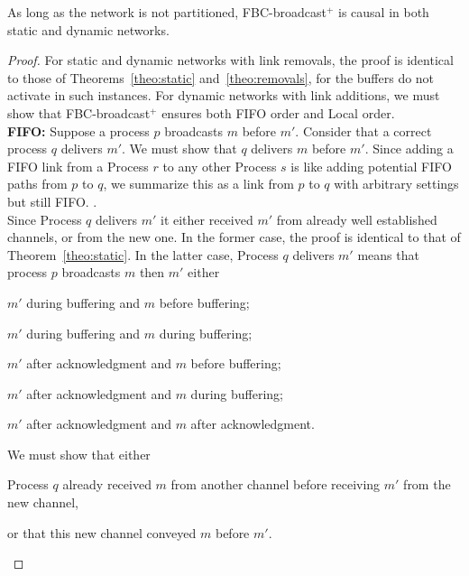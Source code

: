 \begin{theorem}
  As long as the network is not partitioned, FBC-broadcast$^+$ is causal in both
  static and dynamic networks.
\end{theorem}

\begin{proof}
  For static and dynamic networks with link removals, the proof is identical to
  those of Theorems~\ref{theo:static} and~\ref{theo:removals}, for the buffers
  do not activate in such instances. For dynamic networks with link additions,
  we must show that FBC-broadcast$^+$ ensures both
  FIFO order and Local order. \\
  \textbf{FIFO:} Suppose a process $p$ broadcasts $m$ before $m'$. Consider that
  a correct process $q$ delivers $m'$. We must show that $q$ delivers $m$ before
  $m'$.  Since adding a FIFO link from a Process $r$ to any other Process $s$ is
  like adding potential FIFO paths from $p$ to $q$, we summarize this as a link
  from $p$ to $q$ with arbitrary settings but still FIFO.  . \\   
  Since Process $q$ delivers $m'$ it either received $m'$ from already well
  established channels, or from the new one. In the former case, the proof is
  identical to that of Theorem~\ref{theo:static}. In the latter case, Process
  $q$ delivers $m'$ means that process $p$ broadcasts $m$ then $m'$ either
  \begin{inparaenum}[(i)]
  \item \label{case:one} $m'$ during buffering and $m$ before buffering;
  \item \label{case:two} $m'$ during buffering and $m$ during buffering;
  \item \label{case:three} $m'$ after acknowledgment and $m$ before buffering;
  \item \label{case:four} $m'$ after acknowledgment and $m$ during buffering;
  \item \label{case:five} $m'$ after acknowledgment and $m$ after acknowledgment.
  \end{inparaenum}
  We must show that either 
  \begin{inparaenum}[(1)]
  \item \label{show:one} Process $q$ already received $m$ from another channel
    before receiving $m'$ from the new channel,
  \item \label{show:two} or that this new channel conveyed $m$ before $m'$.
  \end{inparaenum}


\end{proof}
